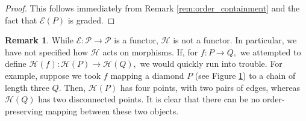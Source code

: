 \documentclass[10 pt]{amsart}
\theoremstyle{plain}
\theoremstyle{definition}
\newtheorem{rem}[thm]{Remark}
\theoremstyle{remark}
\numberwithin{equation}{section}
\begin{document}
\begin{proof}
This follows immediately from Remark \ref{rem:order_containment} and the fact that $\mathcal E(P)$ is graded.
\end{proof}


\begin{rem}
While $\mathcal E:\mathcal P \rightarrow \mathcal P$ is a functor, $\mathcal H$ is not a functor. In particular, we have not specified how $\mathcal H$ acts on morphisms. If, for $f:P \rightarrow Q,$ we attempted to define $\mathcal H(f):\mathcal H(P) \rightarrow \mathcal H(Q),$ we would quickly run into trouble. For example, suppose we took $f$ mapping a diamond $P$ (see Figure \ref{fig:h_morphism}) to a chain of length three $Q$. Then, $\mathcal H(P)$ has four points, with two pairs of edges, whereas $\mathcal H(Q)$ has two disconnected points. It is clear that there can be no order-preserving mapping between these two objects.

\begin{figure}[h!]
\label{fig:h_morphism}
\begin{center}
\quad
{}\quad
{} \quad
{}
\end{center}
\caption{}
\end{figure}
\end{rem}
\end{document}
